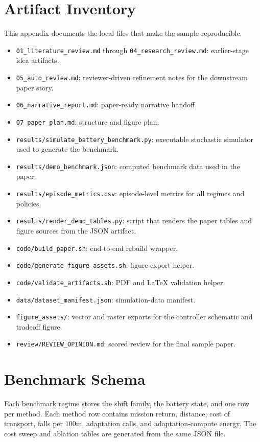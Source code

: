 \section{Artifact Inventory}

This appendix documents the local files that make the sample reproducible.

\begin{itemize}
\item \texttt{01\_literature\_review.md} through \texttt{04\_research\_review.md}: earlier-stage idea artifacts.
\item \texttt{05\_auto\_review.md}: reviewer-driven refinement notes for the downstream paper story.
\item \texttt{06\_narrative\_report.md}: paper-ready narrative handoff.
\item \texttt{07\_paper\_plan.md}: structure and figure plan.
\item \texttt{results/simulate\_battery\_benchmark.py}: executable stochastic simulator used to generate the benchmark.
\item \texttt{results/demo\_benchmark.json}: computed benchmark data used in the paper.
\item \texttt{results/episode\_metrics.csv}: episode-level metrics for all regimes and policies.
\item \texttt{results/render\_demo\_tables.py}: script that renders the paper tables and figure sources from the JSON artifact.
\item \texttt{code/build\_paper.sh}: end-to-end rebuild wrapper.
\item \texttt{code/generate\_figure\_assets.sh}: figure-export helper.
\item \texttt{code/validate\_artifacts.sh}: PDF and LaTeX validation helper.
\item \texttt{data/dataset\_manifest.json}: simulation-data manifest.
\item \texttt{figure\_assets/}: vector and raster exports for the controller schematic and tradeoff figure.
\item \texttt{review/REVIEW\_OPINION.md}: scored review for the final sample paper.
\end{itemize}

\section{Benchmark Schema}

Each benchmark regime stores the shift family, the battery state, and one row per method. Each method row contains mission return, distance, cost of transport, falls per $100$m, adaptation calls, and adaptation-compute energy. The cost sweep and ablation tables are generated from the same JSON file.

